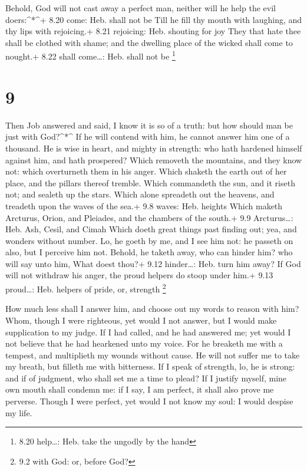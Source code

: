  Behold, God will not cast away a perfect man, neither will
he help the evil doers:\^{}*\^{}+ 8.20 come: Heb. shall not be
 Till he fill thy mouth with laughing, and thy lips with
rejoicing.+ 8.21 rejoicing: Heb. shouting for joy  They
that hate thee shall be clothed with shame; and the dwelling place of
the wicked shall come to nought.+ 8.22 shall come\ldots: Heb. shall not
be \footnote{8.20 help\ldots: Heb. take the ungodly by the hand}

\hypertarget{section-8}{%
\section{9}\label{section-8}}

 Then Job answered and said,  I know it is so of
a truth: but how should man be just with God?\^{}*\^{}  If
he will contend with him, he cannot answer him one of a thousand.
 He is wise in heart, and mighty in strength: who hath
hardened himself against him, and hath prospered?  Which
removeth the mountains, and they know not: which overturneth them in his
anger.  Which shaketh the earth out of her place, and the
pillars thereof tremble.  Which commandeth the sun, and it
riseth not; and sealeth up the stars.  Which alone spreadeth
out the heavens, and treadeth upon the waves of the sea.+ 9.8 waves:
Heb. heights  Which maketh Arcturus, Orion, and Pleiades,
and the chambers of the south.+ 9.9 Arcturus\ldots: Heb. Ash, Cesil, and
Cimah  Which doeth great things past finding out; yea, and
wonders without number.  Lo, he goeth by me, and I see him
not: he passeth on also, but I perceive him not.  Behold,
he taketh away, who can hinder him? who will say unto him, What doest
thou?+ 9.12 hinder\ldots: Heb. turn him away?  If God will
not withdraw his anger, the proud helpers do stoop under him.+ 9.13
proud\ldots: Heb. helpers of pride, or, strength \footnote{9.2 with God:
  or, before God?}

 How much less shall I answer him, and choose out my words
to reason with him?  Whom, though I were righteous, yet
would I not answer, but I would make supplication to my judge.
 If I had called, and he had answered me; yet would I not
believe that he had hearkened unto my voice.  For he
breaketh me with a tempest, and multiplieth my wounds without cause.
 He will not suffer me to take my breath, but filleth me
with bitterness.  If I speak of strength, lo, he is strong:
and if of judgment, who shall set me a time to plead?  If I
justify myself, mine own mouth shall condemn me: if I say, I am perfect,
it shall also prove me perverse.  Though I were perfect,
yet would I not know my soul: I would despise my life.

